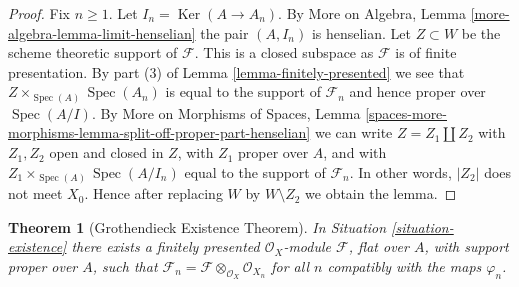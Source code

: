 \documentclass{stacks-project}
\theoremstyle{plain}
\newtheorem{theorem}[subsection]{Theorem}
\theoremstyle{definition}
\theoremstyle{remark}
\numberwithin{equation}{subsection}
\def\Spec{\mathop{\mathrm{Spec}}}
\def\Ker{\mathop{\mathrm{Ker}}}
\begin{document}
\begin{proof}
Fix $n \geq 1$. Let $I_n = \Ker(A \to A_n)$.
By More on Algebra, Lemma \ref{more-algebra-lemma-limit-henselian}
the pair $(A, I_n)$ is henselian.
Let $Z \subset W$ be the scheme theoretic support of $\mathcal{F}$.
This is a closed subspace as $\mathcal{F}$ is of finite presentation.
By part (3) of Lemma \ref{lemma-finitely-presented}
we see that $Z \times_{\Spec(A)} \Spec(A_n)$
is equal to the support of $\mathcal{F}_n$ and hence
proper over $\Spec(A/I)$.
By More on Morphisms of Spaces, Lemma
\ref{spaces-more-morphisms-lemma-split-off-proper-part-henselian}
we can write $Z = Z_1 \amalg Z_2$ with $Z_1, Z_2$ open and
closed in $Z$, with $Z_1$ proper
over $A$, and with $Z_1 \times_{\Spec(A)} \Spec(A/I_n)$
equal to the support of $\mathcal{F}_n$.
In other words, $|Z_2|$ does not meet $X_0$.
Hence after replacing $W$ by $W \setminus Z_2$ we obtain the lemma.
\end{proof}

\begin{theorem}[Grothendieck Existence Theorem]
\label{theorem-existence}
In Situation \ref{situation-existence}
there exists a finitely presented $\mathcal{O}_X$-module
$\mathcal{F}$, flat over $A$, with support proper over $A$,
such that
$\mathcal{F}_n = \mathcal{F} \otimes_{\mathcal{O}_X} \mathcal{O}_{X_n}$
for all $n$ compatibly with the maps $\varphi_n$.
\end{theorem}
\end{document}
